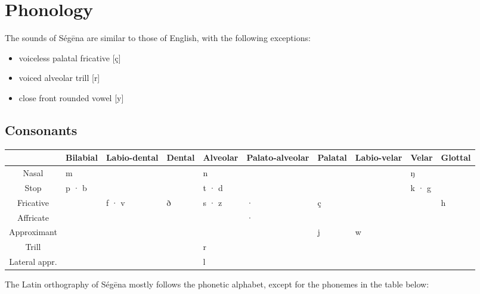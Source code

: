 \chapter{Phonology}

The sounds of Ségēna are similar to those of English, with the following
exceptions:

\begin{itemize}
	\item voiceless palatal fricative [ç]
	\item voiced alveolar trill [r]
	\item close front rounded vowel [y]
\end{itemize}

\section{Consonants}

\begin{table}[H]
\begin{tabularx}{\textwidth}{ c|Y|Y|Y|Y|Y|Y|Y|Y|Y }
	              & Bilabial & Labio-dental & Dental & Alveolar & Palato-alveolar & Palatal & Labio-velar & Velar & Glottal \\
	\hline
	Nasal         & m        &              &        & n        &                 &         &             & ŋ     &         \\
	Stop          & p · b    &              &        & t · d    &                 &         &             & k · g &         \\
	Fricative     &          & f · v        & ð      & s · z    & \sh{} · \zh{}   & ç       &             &       & h       \\
	Affricate     &          &              &        &          & \tsh{} · \dzh{} &         &             &       &         \\
	Approximant   &          &              &        &          &                 & j       & w           &       &         \\
	Trill         &          &              &        & r        &                 &         &             &       &         \\
	Lateral appr. &          &              &        & l        &                 &         &             &       &         \\
\end{tabularx}
\end{table}

The Latin orthography of Ségēna mostly follows the phonetic alphabet, except for
the phonemes in the table below:

